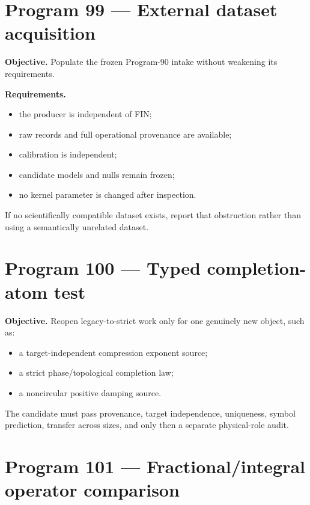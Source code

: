 \documentclass[11pt,a4paper,openany]{report}
\begin{document}
\section{Program 99 --- External dataset acquisition}

\textbf{Objective.} Populate the frozen Program-90 intake without weakening its requirements.

\textbf{Requirements.}

\begin{itemize}
\item 
the producer is independent of FIN;

\item 
raw records and full operational provenance are available;

\item 
calibration is independent;

\item 
candidate models and nulls remain frozen;

\item 
no kernel parameter is changed after inspection.

\end{itemize}

If no scientifically compatible dataset exists, report that obstruction rather than using a semantically unrelated dataset.

\section{Program 100 --- Typed completion-atom test}

\textbf{Objective.} Reopen legacy-to-strict work only for one genuinely new object, such as:

\begin{itemize}
\item 
a target-independent compression exponent source;

\item 
a strict phase/\allowbreak{}topological completion law;

\item 
a noncircular positive damping source.

\end{itemize}

The candidate must pass provenance, target independence, uniqueness, symbol prediction, transfer across sizes, and only then a separate physical-role audit.

\section{Program 101 --- Fractional/\allowbreak{}integral operator comparison}
\end{document}
